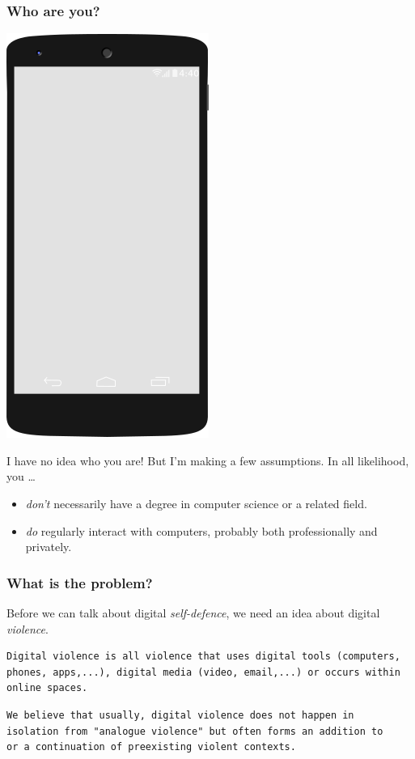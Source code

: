\documentclass[aspectratio=1610,dvipsnames]{beamer}
\begin{document}
\begin{frame}
\frametitle{Who are you?}
\begin{minipage}{0.4\textwidth}
\begin{center}
\includegraphics[scale=0.4]{images/smartphone} 
\end{center}
\end{minipage}%
\begin{minipage}{0.6\textwidth}
I have no idea who you are! But I'm making a few assumptions. 
In all likelihood, you \dots
\medskip

\begin{itemize}
\pause\item\emph{don't} necessarily have a degree in computer science or a related field.
\pause\item\emph{do} regularly interact with computers, probably both professionally and privately.
\end{itemize}
\end{minipage}
\end{frame}

\begin{frame}[fragile]
\frametitle{What is the problem?}

Before we can talk about digital \emph{self-defence}, we need an idea about digital \emph{violence}.
\pause\bigskip

\begin{verbatim}
Digital violence is all violence that uses digital tools (computers,
phones, apps,...), digital media (video, email,...) or occurs within
online spaces.
\end{verbatim}
\pause
\begin{verbatim}
We believe that usually, digital violence does not happen in
isolation from "analogue violence" but often forms an addition to
or a continuation of preexisting violent contexts.

\end{verbatim}
\end{frame}
\end{document}
